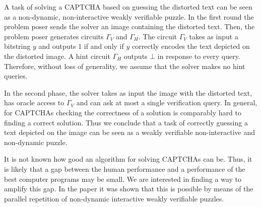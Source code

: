 A task of solving a CAPTCHA based on guessing the distorted text can be seen as a non-dynamic,
non-interactive weakly verifiable puzzle.
In the first round the problem poser sends the solver an image containing the distorted text.
Then, the problem poser generates circuits $\Gamma_V$ and $\Gamma_H$.
The circuit $\Gamma_V$ takes as input a bitstring $y$ and outputs $1$
if and only if $y$ correctly encodes the text depicted on the distorted image.
A hint circuit $\Gamma_H$ outputs $\bot$ in response to every query.
Therefore, without loss of generality, we assume that the solver makes no hint queries.

In the second phase, the solver takes as input the image with the distorted text, has oracle access to $\Gamma_V$
and can ask at most a single verification query. In general, for CAPTCHAs checking the correctness of a solution is
comparably hard to finding a correct solution.
Thus we conclude that a task of correctly guessing a text depicted on the image can be seen as a weakly verifiable non-interactive and non-dynamic puzzle.

It is not known how good an algorithm for solving CAPTCHAs can be. Thus, it is likely that a gap between the human
performance and a performance of the best computer programs may be small. We are interested in finding a way to amplify this gap.
In the paper \cite{holenstein2011general} it was shown that this is possible by means of the parallel repetition of non-dynamic
interactive weakly verifiable puzzles.



